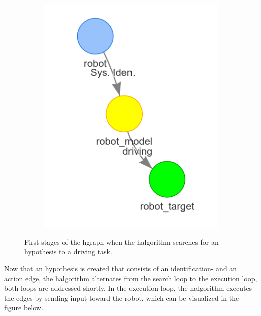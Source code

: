 \begin{figure}[h]
\begin{subfigure}{.3\textwidth}
    \end{subfigure}
    \begin{subfigure}{.3\textwidth}
    \centering
    \includegraphics[width=\textwidth]{figures/proposed_method/connecting_nodes/robot_to_target/robot_iden_drive_target}
    \end{subfigure}
    \caption{First stages of the \ac{hgraph} when the \ac{halgorithm} searches for an hypothesis to a driving task.}%
    \label{fig:robot_drive_hgraph}
\end{figure}

Now that an hypothesis is created that consists of an identification- and an action edge, the \ac{halgorithm} alternates from the search loop to the execution loop, both loops are addressed shortly. In the execution loop, the \ac{halgorithm} executes the edges by sending input toward the robot, which can be visualized in the figure below.\bs

